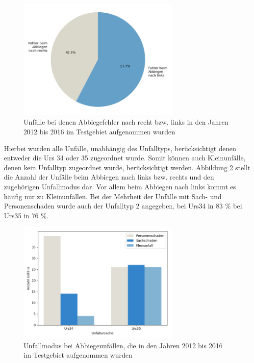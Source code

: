 \begin{savenotes}
	\begin{figure}[H]
		\centering
		\includegraphics[width=8cm,height=6cm]{figures/These_1}
		\caption[Unfälle bei denen Abbiegefehler nach recht bzw. links in den Jahren 2012 bis 2016 im Testgebiet aufgenommen wurden]{Unfälle bei denen Abbiegefehler nach recht bzw. links in den Jahren 2012 bis 2016 im Testgebiet aufgenommen wurden}\label{fig:Abbiegen_rechts_links}
	\end{figure}
\end{savenotes}

Hierbei wurden alle Unfälle, unabhängig des Unfalltyps, berücksichtigt denen entweder die \ac{Urs} 34 oder 35 zugeordnet wurde. Somit können auch Kleinunfälle, denen kein Unfalltyp zugeordnet wurde, berücksichtigt werden. Abbildung \ref{fig:Abbiegen_Md} stellt die Anzahl der Unfälle beim Abbiegen nach links bzw. rechts und den zugehörigen Unfallmodus dar. Vor allem beim Abbiegen nach links kommt es häufig nur zu Kleinunfällen.
Bei der Mehrheit der Unfälle mit Sach- und Personenschaden wurde auch der Unfalltyp 2 angegeben, bei Urs34 in 83 \% bei Urs35 in 76 \%.

\begin{savenotes}
	\begin{figure}[H]
		\centering
		\includegraphics[width=8cm,height=6cm]{figures/Abbiegen_Md}
		\caption[Unfallmodus bei Abbiegeunfällen, die in den Jahren 2012 bis 2016 im Testgebiet aufgenommen wurden]{Unfallmodus bei Abbiegeunfällen, die in den Jahren 2012 bis 2016 im Testgebiet aufgenommen wurden}\label{fig:Abbiegen_Md}
	\end{figure}
\end{savenotes}

